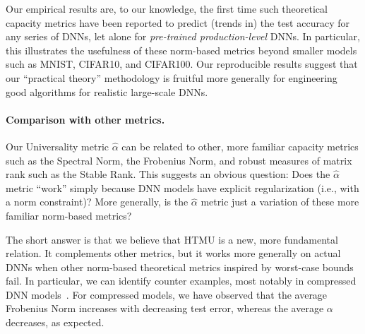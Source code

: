 \vspace{-4mm}


Our empirical results are, to our knowledge, the first time such theoretical capacity 
metrics have been reported to predict (trends in) the test accuracy for any series of DNNs, let alone for \emph{pre-trained production-level} DNNs.
In particular, this illustrates the usefulness of these norm-based metrics beyond smaller models such as MNIST, CIFAR10, and CIFAR100. 
Our 
reproducible
results suggest that our ``practical theory'' methodology is fruitful more generally for engineering good algorithms for realistic large-scale DNNs.

\vspace{-2mm}
\paragraph{Comparison with other metrics.}
Our Universality metric $\hat{\alpha}$ can be related to other, more familiar capacity metrics such as the Spectral Norm, the Frobenius Norm, and robust measures of matrix rank such as the Stable Rank.
This suggests an obvious question: 
Does the $\hat{\alpha}$ metric ``work'' simply because DNN models have explicit regularization (i.e., with a norm constraint)?
More generally, is the $\hat{\alpha}$ metric just a variation of these more familiar norm-based metrics?  

The short answer is that we believe that HTMU is a new, more fundamental relation. 
It complements other metrics, but it works more generally on actual DNNs when other norm-based theoretical metrics inspired by worst-case bounds fail. 
In particular, we can identify counter examples, most notably in compressed DNN models~\cite{CWZZ17_TR}.
For compressed models, we have observed that the average Frobenius Norm increases with decreasing test error, whereas the average $\alpha$ decreases, as expected.  


